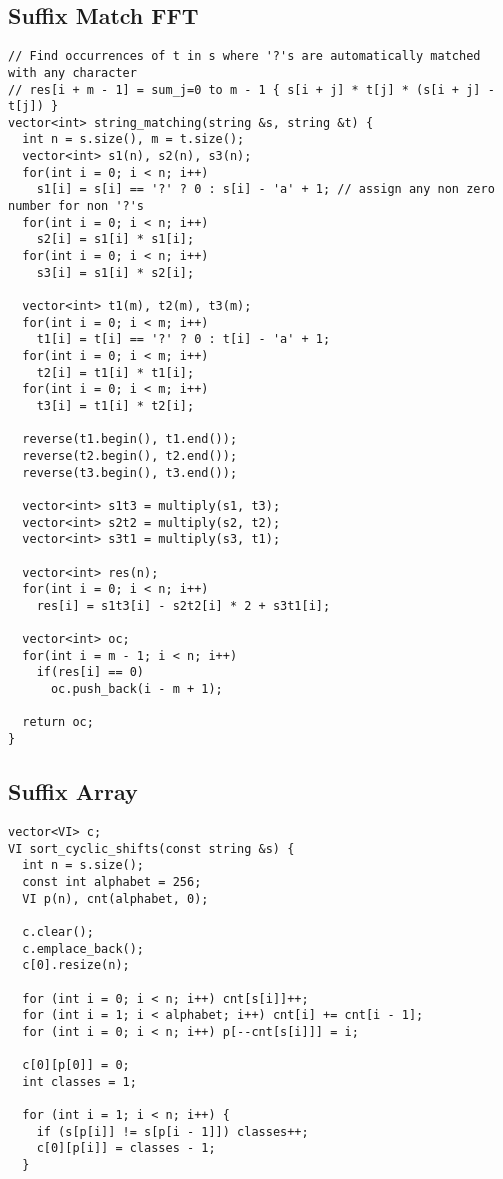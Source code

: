 \documentclass[FSZ,a4paper,onesided]{article}
\begin{document}
\begin{multicols*}{\COLS}
\subsection{Suffix Match FFT}
\begin{lstlisting}
// Find occurrences of t in s where '?'s are automatically matched with any character
// res[i + m - 1] = sum_j=0 to m - 1 { s[i + j] * t[j] * (s[i + j] - t[j]) }
vector<int> string_matching(string &s, string &t) {
  int n = s.size(), m = t.size();
  vector<int> s1(n), s2(n), s3(n);
  for(int i = 0; i < n; i++)
    s1[i] = s[i] == '?' ? 0 : s[i] - 'a' + 1; // assign any non zero number for non '?'s
  for(int i = 0; i < n; i++)
    s2[i] = s1[i] * s1[i];
  for(int i = 0; i < n; i++)
    s3[i] = s1[i] * s2[i];
  
  vector<int> t1(m), t2(m), t3(m);
  for(int i = 0; i < m; i++)
    t1[i] = t[i] == '?' ? 0 : t[i] - 'a' + 1;
  for(int i = 0; i < m; i++)
    t2[i] = t1[i] * t1[i];
  for(int i = 0; i < m; i++)
    t3[i] = t1[i] * t2[i];
  
  reverse(t1.begin(), t1.end());
  reverse(t2.begin(), t2.end());
  reverse(t3.begin(), t3.end());
  
  vector<int> s1t3 = multiply(s1, t3);
  vector<int> s2t2 = multiply(s2, t2);
  vector<int> s3t1 = multiply(s3, t1);
  
  vector<int> res(n);
  for(int i = 0; i < n; i++)
    res[i] = s1t3[i] - s2t2[i] * 2 + s3t1[i];
  
  vector<int> oc;
  for(int i = m - 1; i < n; i++)
    if(res[i] == 0)
      oc.push_back(i - m + 1);
  
  return oc;
}
\end{lstlisting}
\subsection{Suffix Array}
\begin{lstlisting}
vector<VI> c;
VI sort_cyclic_shifts(const string &s) {
  int n = s.size();
  const int alphabet = 256;
  VI p(n), cnt(alphabet, 0);

  c.clear();
  c.emplace_back();
  c[0].resize(n);

  for (int i = 0; i < n; i++) cnt[s[i]]++;
  for (int i = 1; i < alphabet; i++) cnt[i] += cnt[i - 1];
  for (int i = 0; i < n; i++) p[--cnt[s[i]]] = i;

  c[0][p[0]] = 0;
  int classes = 1;

  for (int i = 1; i < n; i++) {
    if (s[p[i]] != s[p[i - 1]]) classes++;
    c[0][p[i]] = classes - 1;
  }


\end{lstlisting}
\end{multicols*}
\end{document}
